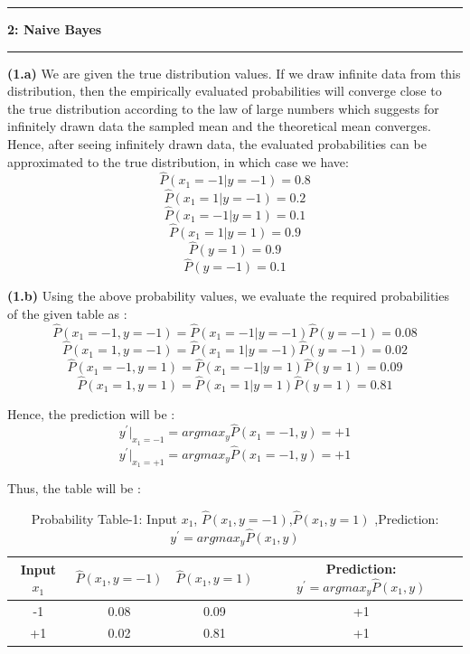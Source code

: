 \documentclass{article}
\newcommand\question[2]{\vspace{.25in}\hrule\textbf{#1: #2}\hrule\vspace{.10in}}
\renewcommand\part[1]{\vspace{.10in}\textbf{(#1)}}
\begin{document}
  \question{2}{Naive Bayes}
  \part{1.a} We are given the true distribution values. If we draw infinite data from this distribution, then the empirically evaluated probabilities will converge close to the true distribution according to the law of large numbers which suggests for infinitely drawn data the sampled mean and the theoretical mean converges. Hence, after seeing infinitely drawn data, the evaluated probabilities can be approximated to the true distribution, in which case we have:
  \[\hat{P}(x_1 = -1| y = -1) = 0.8\]
  \[\hat{P}(x_1 = 1| y = -1) = 0.2\]
  \[\hat{P}(x_1 = -1| y = 1) = 0.1\]
  \[\hat{P}(x_1 = 1| y = 1) = 0.9\]
  \[\hat{P}(y=1) = 0.9 \]
  \[\hat{P}(y=-1) = 0.1 \]

  \part{1.b} Using the above probability values, we evaluate the required probabilities of the given table as :
  \[\hat{P}(x_1 = -1, y = -1) = \hat{P}(x_1 = -1| y = -1)\hat{P}(y= -1) = 0.08\]
  \[\hat{P}(x_1 = 1, y = -1) = \hat{P}(x_1 = 1| y = -1)\hat{P}(y= -1) = 0.02\]
  \[\hat{P}(x_1 = -1, y = 1) = \hat{P}(x_1 = -1| y = 1)\hat{P}(y= 1) = 0.09\]
  \[\hat{P}(x_1 = 1, y = 1) = \hat{P}(x_1 = 1| y = 1)\hat{P}(y= 1) = 0.81\]

  Hence, the prediction will be : 
  \[y^\prime\bigg |_{x_1=-1} = argmax_y\hat{P}(x_1=-1,y) = +1\]
  \[y^\prime\bigg |_{x_1=+1} = argmax_y\hat{P}(x_1=-1,y) = +1\]

  Thus, the table will be :
\begin{longtable}{c|c|c|c}
	\caption{Probability Table-1: Input $x_1$, $\hat{P}(x_1,y=-1)$,$\hat{P}(x_1,y=1)$ ,Prediction: $y^\prime = arg max_y \hat{P}(x_1,y)$} \\
  \hline\hline
	  Input $x_1$ & $\hat{P}(x_1,y=-1)$ & $\hat{P}(x_1,y=1)$  & Prediction: $y^\prime = arg max_y \hat{P}(x_1,y)$ \\ [0.5ex]
  \hline
	  -1 & 0.08 & 0.09 & +1  \\
	  +1 & 0.02 & 0.81 & +1 \\
  \end{longtable}
\end{document}
